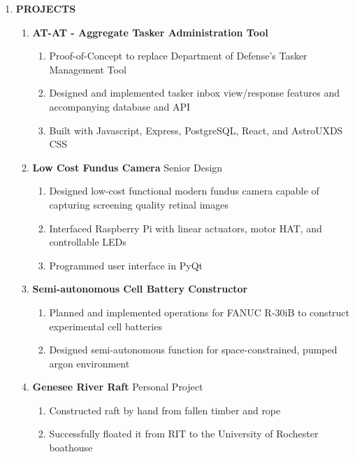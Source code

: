 \documentclass[11pt]{article}
\begin{document}
\begin{center}
\begin{enumerate}[label={}, leftmargin=0pt, parsep=5pt]
    \item {\Large \textbf{PROJECTS}}
    \begin{enumerate}[label={}, itemsep=5pt]
        \item \textbf{AT-AT - Aggregate Tasker Administration Tool}
        \begin{enumerate}[label={--}]
            \item Proof-of-Concept to replace Department of Defense's Tasker Management Tool
            \item Designed and implemented tasker inbox view/response features and accompanying database and API
            \item Built with Javascript, Express, PostgreSQL, React, and AstroUXDS CSS
        \end{enumerate}
        \item \textbf{Low Cost Fundus Camera} \textbar{} Senior Design
        \begin{enumerate}[label={--}]
            \item Designed low-cost functional modern fundus camera capable of capturing screening quality retinal images
            \item Interfaced Raspberry Pi with linear actuators, motor HAT, and controllable LEDs
            \item Programmed user interface in PyQt
        \end{enumerate}
        \item \textbf{Semi-autonomous Cell Battery Constructor}
        \begin{enumerate}[label={--}]
            \item Planned and implemented operations for FANUC R-30iB to construct experimental cell batteries
            \item Designed semi-autonomous function for space-constrained, pumped argon environment
        \end{enumerate}
        \item \textbf{Genesee River Raft} \textbar{} Personal Project
        \begin{enumerate}[label={--}]
            \item Constructed raft by hand from fallen timber and rope
            \item Successfully floated it from RIT to the University of Rochester boathouse
        \end{enumerate}
    \end{enumerate}
\end{enumerate}
\end{center}
\end{document}
